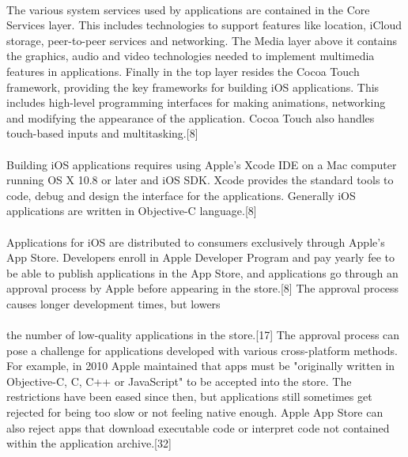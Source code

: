 \paragraph{}
The various system services used by applications are contained in the
Core Services layer. This includes technologies to support features like location,
iCloud storage, peer-to-peer services and networking. The Media layer
above it contains the graphics, audio and video technologies needed to implement
multimedia features in applications. Finally in the top layer resides
the Cocoa Touch framework, providing the key frameworks for building iOS
applications. This includes high-level programming interfaces for making
animations, networking and modifying the appearance of the application.
Cocoa Touch also handles touch-based inputs and multitasking.[8]



\paragraph{}
Building iOS applications requires using Apple's Xcode IDE on a Mac
computer running OS X 10.8 or later and iOS SDK. Xcode provides the
standard tools to code, debug and design the interface for the applications.
Generally iOS applications are written in Objective-C language.[8]

\paragraph{}
Applications for iOS are distributed to consumers exclusively through
Apple's App Store. Developers enroll in Apple Developer Program and pay
yearly fee to be able to publish applications in the App Store, and applications
go through an approval process by Apple before appearing in the
store.[8] The approval process causes longer development times, but lowers

\paragraph{}
the number of low-quality applications in the store.[17] The approval process
can pose a challenge for applications developed with various cross-platform
methods. For example, in 2010 Apple maintained that apps must be "originally
written in Objective-C, C, C++ or JavaScript" to be accepted into
the store. The restrictions have been eased since then, but applications still
sometimes get rejected for being too slow or not feeling native enough. Apple
App Store can also reject apps that download executable code or interpret
code not contained within the application archive.[32]


